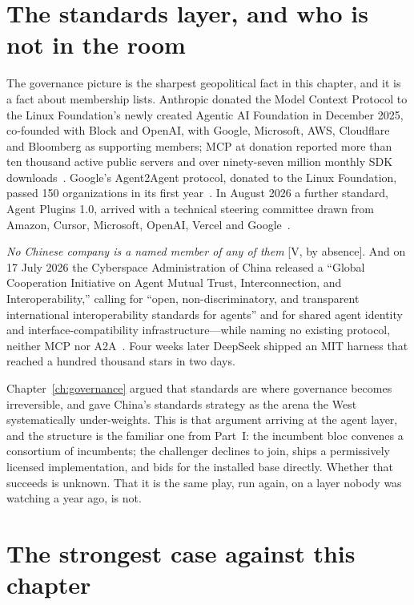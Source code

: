 \section{The standards layer, and who is not in the room}

The governance picture is the sharpest geopolitical fact in this chapter, and it is a fact about membership lists. Anthropic donated the Model Context Protocol to the Linux Foundation's newly created Agentic AI Foundation in December 2025, co-founded with Block and OpenAI, with Google, Microsoft, AWS, Cloudflare and Bloomberg as supporting members; MCP at donation reported more than ten thousand active public servers and over ninety-seven million monthly SDK downloads~\cite{mcp-aaif}. Google's Agent2Agent protocol, donated to the Linux Foundation, passed 150 organizations in its first year~\cite{a2a-year}. In August 2026 a further standard, Agent Plugins 1.0, arrived with a technical steering committee drawn from Amazon, Cursor, Microsoft, OpenAI, Vercel and Google~\cite{agent-plugins}.

\emph{No Chinese company is a named member of any of them} [V, by absence]. And on 17 July 2026 the Cyberspace Administration of China released a ``Global Cooperation Initiative on Agent Mutual Trust, Interconnection, and Interoperability,'' calling for ``open, non-discriminatory, and transparent international interoperability standards for agents'' and for shared agent identity and interface-compatibility infrastructure---while naming no existing protocol, neither MCP nor A2A~\cite{cac-agents}. Four weeks later DeepSeek shipped an MIT harness that reached a hundred thousand stars in two days.

Chapter~\ref{ch:governance} argued that standards are where governance becomes irreversible, and gave China's standards strategy as the arena the West systematically under-weights. This is that argument arriving at the agent layer, and the structure is the familiar one from Part~I: the incumbent bloc convenes a consortium of incumbents; the challenger declines to join, ships a permissively licensed implementation, and bids for the installed base directly. Whether that succeeds is unknown. That it is the same play, run again, on a layer nobody was watching a year ago, is not.

\section{The strongest case against this chapter}

